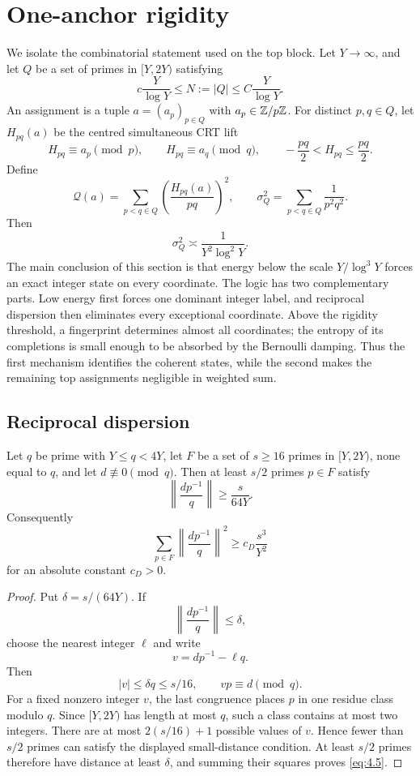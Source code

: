 \section{One-anchor rigidity}\label{sec:anchor}

We isolate the combinatorial statement used on the top block. Let $Y\to\infty$, and let $Q$ be a set of primes in $[Y,2Y)$ satisfying
\[
c\frac{Y}{\log Y}
\le N:=|Q|
\le C\frac{Y}{\log Y}.
\tag{4.1}\label{eq:4.1}
\]
An assignment is a tuple $a=(a_p)_{p\in Q}$ with $a_p\in\mathbb Z/p\mathbb Z$. For distinct $p,q\in Q$, let $H_{pq}(a)$ be the centred simultaneous CRT lift
\[
H_{pq}\equiv a_p\pmod p,
\qquad
H_{pq}\equiv a_q\pmod q,
\qquad
-\frac{pq}{2}<H_{pq}\le\frac{pq}{2}.
\tag{4.2}\label{eq:4.2}
\]
Define
\[
\mathcal Q(a)
=
\sum_{p<q\in Q}
\left(\frac{H_{pq}(a)}{pq}\right)^2,
\qquad
\sigma_Q^2
=
\sum_{p<q\in Q}\frac1{p^2q^2}.
\tag{4.3}\label{eq:4.3}
\]
Then
\[
\sigma_Q^2\asymp\frac1{Y^2\log^2Y}.
\tag{4.4}\label{eq:4.4}
\]
The main conclusion of this section is that energy below the scale $Y/\log^3Y$ forces an exact integer state on every coordinate. The logic has two complementary parts. Low energy first forces one dominant integer label, and reciprocal dispersion then eliminates every exceptional coordinate. Above the rigidity threshold, a fingerprint determines almost all coordinates; the entropy of its completions is small enough to be absorbed by the Bernoulli damping. Thus the first mechanism identifies the coherent states, while the second makes the remaining top assignments negligible in weighted sum.

\subsection{Reciprocal dispersion}

\begin{lemma}\label{lem:reciprocal-dispersion}
Let $q$ be prime with $Y\le q<4Y$, let $F$ be a set of $s\ge16$ primes in $[Y,2Y)$, none equal to $q$, and let $d\not\equiv0\pmod q$. Then at least $s/2$ primes $p\in F$ satisfy
\[
\left\|\frac{d p^{-1}}q\right\|
\ge \frac{s}{64Y}.
\]
Consequently
\[
\sum_{p\in F}
\left\|\frac{d p^{-1}}q\right\|^2
\ge c_D\frac{s^3}{Y^2}
\tag{4.5}\label{eq:4.5}
\]
for an absolute constant $c_D>0$.
\end{lemma}

\begin{proof}
Put $\delta=s/(64Y)$. If
\[
\left\|\frac{dp^{-1}}q\right\|\le\delta,
\]
choose the nearest integer $\ell$ and write
\[
v=dp^{-1}-\ell q.
\]
Then
\[
|v|\le\delta q\le s/16,
\qquad
vp\equiv d\pmod q.
\]
For a fixed nonzero integer $v$, the last congruence places $p$ in one residue class modulo $q$. Since $[Y,2Y)$ has length at most $q$, such a class contains at most two integers. There are at most $2(s/16)+1$ possible values of $v$. Hence fewer than $s/2$ primes can satisfy the displayed small-distance condition. At least $s/2$ primes therefore have distance at least $\delta$, and summing their squares proves \eqref{eq:4.5}.
\end{proof}

